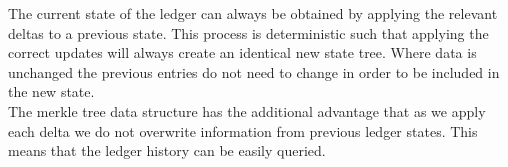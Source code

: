 The current state of the ledger can always be obtained by applying the relevant deltas to a previous state. This process is deterministic such that applying the correct updates will always create an identical new state tree. Where data is unchanged the previous entries do not need to change in order to be included in the new state.\\

The merkle tree data structure has the additional advantage that as we apply each delta we do not overwrite information from previous ledger states. This means that the ledger history can be easily queried.
